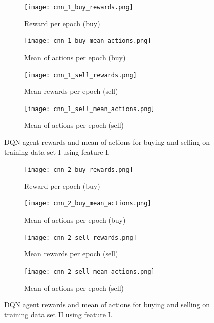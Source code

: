 \begin{figure}[H]
    \centering
    \begin{subfigure}[b]{0.4\textwidth}
        \texttt{[image: cnn\_1\_buy\_rewards.png]}
        \caption{Reward per epoch (buy)}
        \label{fig:analysis-dqn-1-reward-buy}
    \end{subfigure}
    \begin{subfigure}[b]{0.4\textwidth}
        \texttt{[image: cnn\_1\_buy\_mean\_actions.png]}
        \caption{Mean of actions per epoch (buy)}
        \label{fig:analysis-dqn-1-action-buy}
    \end{subfigure}
    \begin{subfigure}[b]{0.4\textwidth}
        \texttt{[image: cnn\_1\_sell\_rewards.png]}
        \caption{Mean rewards per epoch (sell)}
        \label{fig:analysis-dqn-1-reward-sell}
    \end{subfigure}
    \begin{subfigure}[b]{0.4\textwidth}
        \texttt{[image: cnn\_1\_sell\_mean\_actions.png]}
        \caption{Mean of actions per epoch (sell)}
        \label{fig:analysis-dqn-1-action-sell}
    \end{subfigure}
    \caption{DQN agent rewards and mean of actions for buying and selling on training data set I using feature I.}
    \label{fig:analysis-dqn-1}
\end{figure}

\begin{figure}[H]
    \centering
    \begin{subfigure}[b]{0.4\textwidth}
        \texttt{[image: cnn\_2\_buy\_rewards.png]}
        \caption{Reward per epoch (buy)}
        \label{fig:analysis-dqn-2-reward-buy}
    \end{subfigure}
    \begin{subfigure}[b]{0.4\textwidth}
        \texttt{[image: cnn\_2\_buy\_mean\_actions.png]}
        \caption{Mean of actions per epoch (buy)}
        \label{fig:analysis-dqn-2-action-buy}
    \end{subfigure}
    \begin{subfigure}[b]{0.4\textwidth}
        \texttt{[image: cnn\_2\_sell\_rewards.png]}
        \caption{Mean rewards per epoch (sell)}
        \label{fig:analysis-dqn-2-reward-sell}
    \end{subfigure}
    \begin{subfigure}[b]{0.4\textwidth}
        \texttt{[image: cnn\_2\_sell\_mean\_actions.png]}
        \caption{Mean of actions per epoch (sell)}
        \label{fig:analysis-dqn-2-action-sell}
    \end{subfigure}
    \caption{DQN agent rewards and mean of actions for buying and selling on training data set II using feature I.}
    \label{fig:analysis-dqn-2}
\end{figure}

